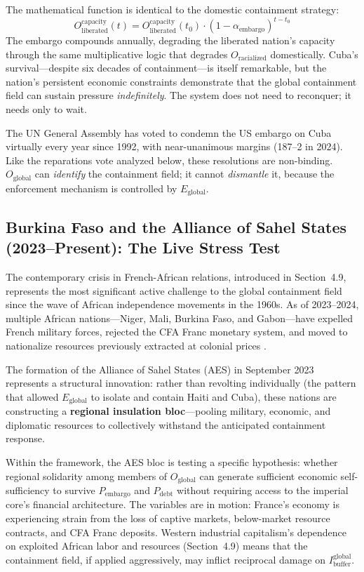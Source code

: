 \documentclass[12pt,openany]{book}
\begin{document}
The mathematical function is identical to the domestic containment strategy:
\[
O_{\text{liberated}}^{\text{capacity}}(t) = O_{\text{liberated}}^{\text{capacity}}(t_0) \cdot (1 - \alpha_{\text{embargo}})^{t - t_0}
\]
The embargo compounds annually, degrading the liberated nation's capacity through the same multiplicative logic that degrades $O_{\text{racialized}}$ domestically. Cuba's survival---despite six decades of containment---is itself remarkable, but the nation's persistent economic constraints demonstrate that the global containment field can sustain pressure \textit{indefinitely}. The system does not need to reconquer; it needs only to wait.

The UN General Assembly has voted to condemn the US embargo on Cuba virtually every year since 1992, with near-unanimous margins (187--2 in 2024). Like the reparations vote analyzed below, these resolutions are non-binding. $O_{\text{global}}$ can \textit{identify} the containment field; it cannot \textit{dismantle} it, because the enforcement mechanism is controlled by $E_{\text{global}}$.

\subsection{Burkina Faso and the Alliance of Sahel States (2023--Present): The Live Stress Test}

The contemporary crisis in French-African relations, introduced in Section~4.9, represents the most significant active challenge to the global containment field since the wave of African independence movements in the 1960s. As of 2023--2024, multiple African nations---Niger, Mali, Burkina Faso, and Gabon---have expelled French military forces, rejected the CFA Franc monetary system, and moved to nationalize resources previously extracted at colonial prices \cite{pigeaud}.

The formation of the Alliance of Sahel States (AES) in September 2023 represents a structural innovation: rather than revolting individually (the pattern that allowed $E_{\text{global}}$ to isolate and contain Haiti and Cuba), these nations are constructing a \textbf{regional insulation bloc}---pooling military, economic, and diplomatic resources to collectively withstand the anticipated containment response.

Within the framework, the AES bloc is testing a specific hypothesis: whether regional solidarity among members of $O_{\text{global}}$ can generate sufficient economic self-sufficiency to survive $P_{\text{embargo}}$ and $P_{\text{debt}}$ without requiring access to the imperial core's financial architecture. The variables are in motion: France's economy is experiencing strain from the loss of captive markets, below-market resource contracts, and CFA Franc deposits. Western industrial capitalism's dependence on exploited African labor and resources (Section~4.9) means that the containment field, if applied aggressively, may inflict reciprocal damage on $I_{\text{buffer}}^{\text{global}}$.
\end{document}
